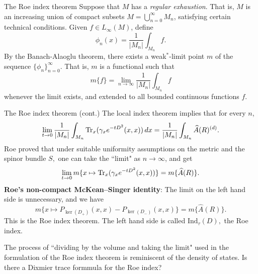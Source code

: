 \documentclass{beamer}
\numberwithin{equation}{section}
\theoremstyle{plain}
\theoremstyle{plain}
\theoremstyle{definition}
\theoremstyle{plain}
\theoremstyle{plain}
\theoremstyle{definition}
\newcommand{\tr}{{\rm Tr}}
\begin{document}
\begin{frame}{The Roe index theorem}
    Suppose that $M$ has a \emph{regular exhaustion}. That is, $M$ is an increasing union of compact subsets $M = \bigcup_{n=0}^\infty M_n$, satisfying certain technical conditions.
    Given $f\in L_\infty(M)$, define
    \begin{equation*}
        \phi_n(x) = \frac{1}{|M_n|}\int_{M_n} f.
    \end{equation*}
    By the Banach-Alaoglu theorem, there exists a weak$^*$-limit point $m$ of the sequence $\{\phi_n\}_{n=0}^\infty$. That is, $m$ is a functional such that
    \begin{equation*}
        m\{f\} = \lim_{n\to\infty} \frac{1}{|M_n|} \int_{M_n} f
    \end{equation*}
    whenever the limit exists, and extended to all bounded continuous functions $f$.
\end{frame}

\begin{frame}{The Roe index theorem (cont.)}
    The local index theorem implies that for every $n$,
    \begin{equation*}
        \lim_{t\to 0} \frac{1}{|M_n|}\int_{M_n}\tr_x(\gamma_xe^{-tD^2}(x,x))\,dx = \frac{1}{|M_n|}\int_{M_n} \widehat{A}(R)^{(d)}.
    \end{equation*}
    Roe proved that under suitable uniformity assumptions on the metric and the spinor bundle $S,$ one can take the ``limit" as $n\to\infty$, and get
    \begin{equation*}
        \lim_{t\to 0} m\{x\mapsto \tr_x(\gamma_xe^{-tD^2}(x,x))\} = m\{\widehat{A}(R)\}.
    \end{equation*}
    \pause
    \textbf{Roe's non-compact McKean--Singer identity}: The limit on the left hand side is unnecessary, and we have
    \begin{equation*}
        m\{x\mapsto P_{\ker(D_+)}(x,x)-P_{\ker(D_-)}(x,x)\} = m\{\widehat{A}(R)\}.
    \end{equation*}
    This is the Roe index theorem. The left hand side is called $\mathrm{Ind}_{\tau}(D),$ the Roe index.
\end{frame}

\begin{frame}
    The process of ``dividing by the volume and taking the limit" used in the formulation of the Roe index theorem is reminiscent of the density of states. Is there a Dixmier trace formmula for the
    Roe index?
\end{frame}
\end{document}
